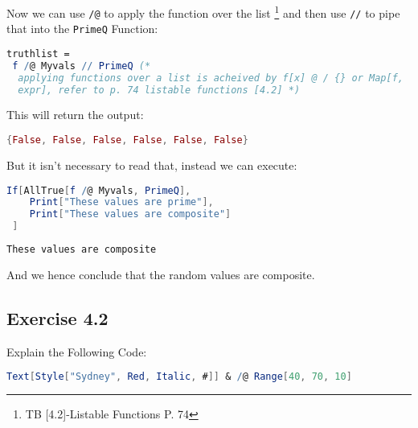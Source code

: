 \documentclass[12pt]{article}
\begin{document}
Now we can use \verb|/@| to apply the function over the list \footnote{TB [4.2]-Listable Functions P. 74} and then use \verb|//| to pipe that into the  \verb|PrimeQ| Function:

\begin{lstlisting}[language = Mathematica]
truthlist = 
 f /@ Myvals // PrimeQ (* 
  applying functions over a list is acheived by f[x] @ / {} or Map[f,
  expr], refer to p. 74 listable functions [4.2] *)
\end{lstlisting}	

This will return the output:

\begin{lstlisting}[language = Mathematica]
{False, False, False, False, False, False}
\end{lstlisting}	

But it isn't necessary to read that, instead we can execute:

\begin{lstlisting}[language = Mathematica]
If[AllTrue[f /@ Myvals, PrimeQ],
 	Print["These values are prime"],
 	Print["These values are composite"]
 ]
\end{lstlisting}	


\begin{lstlisting}[language = Mathematica]
These values are composite
\end{lstlisting}	

And we hence conclude that the random values are composite.

	
	



\subsection{Exercise 4.2}
Explain the Following Code:
\begin{lstlisting}[language = Mathematica]
Text[Style["Sydney", Red, Italic, #]] & /@ Range[40, 70, 10]
\end{lstlisting}	
\end{document}
